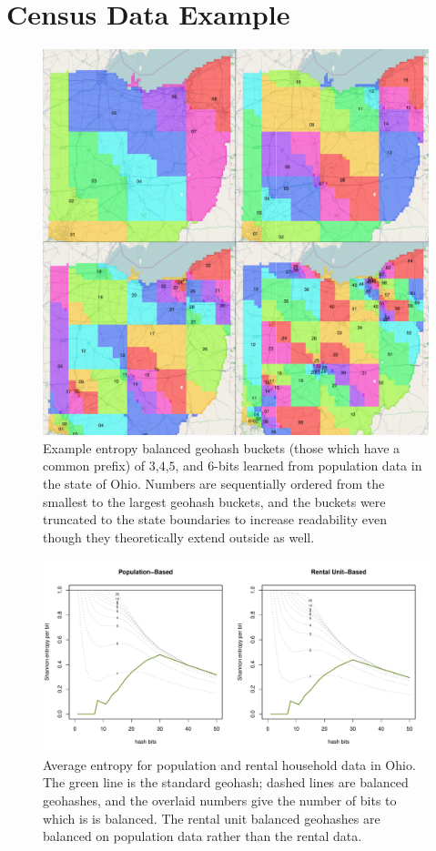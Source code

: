 \documentclass[nips13submit_09,times,art10]{article} %
\begin{document}
\section{Census Data Example}  \label{sec:census}

\begin{figure}
\centering
\includegraphics[width=\textwidth]{fig02}
\caption{Example entropy balanced geohash buckets (those which have a common prefix)
of $3$,$4$,$5$, and $6$-bits learned from population data in the state of Ohio.
Numbers are sequentially ordered from the smallest to the largest geohash buckets,
and the buckets were truncated to the state boundaries to increase readability
even though they theoretically extend outside as well.}
\label{fig:ohioHash}
\end{figure}

\begin{figure}
\centering
\includegraphics[width=6in]{fig03}
\caption{Average entropy for population and rental household data in Ohio. The green
line is the standard geohash; dashed lines are balanced geohashes, and the overlaid
numbers give the number of bits to which is is balanced. The rental unit balanced
geohashes are balanced on population data rather than the rental data.}
 \label{fig:ohioEntropy}
\end{figure}
\end{document}
